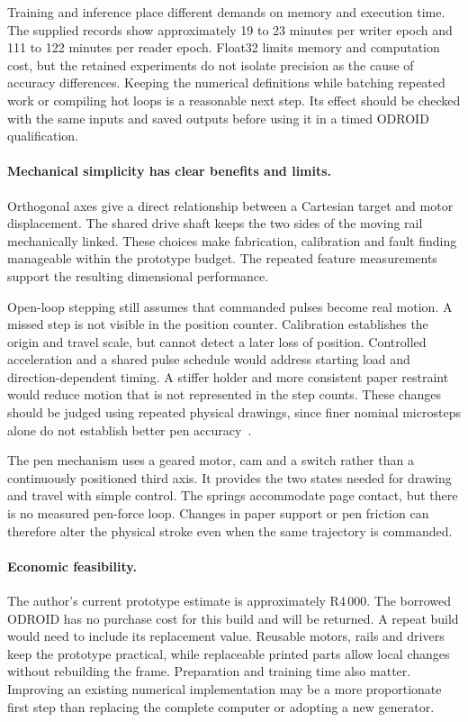 Training and inference place different demands on memory and execution time. The supplied records show approximately 19 to 23 minutes per writer epoch and 111 to 122 minutes per reader epoch. Float32 limits memory and computation cost, but the retained experiments do not isolate precision as the cause of accuracy differences. Keeping the numerical definitions while batching repeated work or compiling hot loops is a reasonable next step. Its effect should be checked with the same inputs and saved outputs before using it in a timed ODROID qualification.

\paragraph{Mechanical simplicity has clear benefits and limits.}
Orthogonal axes give a direct relationship between a Cartesian target and motor displacement. The shared drive shaft keeps the two sides of the moving rail mechanically linked. These choices make fabrication, calibration and fault finding manageable within the prototype budget. The repeated feature measurements support the resulting dimensional performance.

Open-loop stepping still assumes that commanded pulses become real motion. A missed step is not visible in the position counter. Calibration establishes the origin and travel scale, but cannot detect a later loss of position. Controlled acceleration and a shared pulse schedule would address starting load and direction-dependent timing. A stiffer holder and more consistent paper restraint would reduce motion that is not represented in the step counts. These changes should be judged using repeated physical drawings, since finer nominal microsteps alone do not establish better pen accuracy~\cite{acarnley2002}.

The pen mechanism uses a geared motor, cam and a switch rather than a continuously positioned third axis. It provides the two states needed for drawing and travel with simple control. The springs accommodate page contact, but there is no measured pen-force loop. Changes in paper support or pen friction can therefore alter the physical stroke even when the same trajectory is commanded.

\paragraph{Economic feasibility.}
The author's current prototype estimate is approximately R4\,000. The borrowed ODROID has no purchase cost for this build and will be returned. A repeat build would need to include its replacement value. Reusable motors, rails and drivers keep the prototype practical, while replaceable printed parts allow local changes without rebuilding the frame. Preparation and training time also matter. Improving an existing numerical implementation may be a more proportionate first step than replacing the complete computer or adopting a new generator.

